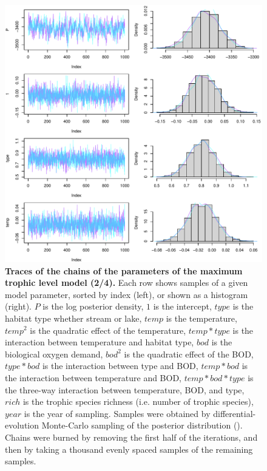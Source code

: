 \documentclass[11pt, oneside]{article}
\begin{document}
\begin{figure}[H]
\begin{center}
\includegraphics[page=2, width=1\linewidth]{b0_6_2/out_mTL/fig_tracePlot_beta.pdf}
\caption{
    \textbf{Traces of the chains of the parameters of the maximum trophic level model (2/4).}
    Each row shows samples of a given model parameter, sorted by index (left), or shown as a histogram (right).
    $P$ is the log posterior density, $1$ is the intercept, $type$ is the habitat type whether stream or lake, $temp$ is the temperature, $temp^2$ is the quadratic effect of the temperature, $temp * type$ is the interaction between temperature and habitat type, $bod$ is the biological oxygen demand, $bod^2$ is the quadratic effect of the BOD, $type * bod$ is the interaction between type and BOD, $temp * bod$ is the interaction between temperature and BOD, $temp * bod * type$ is the three-way interaction between temperature, BOD, and type, $rich$ is the trophic species richness (i.e. number of trophic species), $year$ is the year of sampling.
    Samples were obtained by differential-evolution Monte-Carlo sampling of the posterior distribution (\cite{TerBraak2006}).
    Chains were burned by removing the first half of the iterations, and then by taking a thousand evenly spaced samples of the remaining samples.
}
\end{center}
\end{figure}
\end{document}
